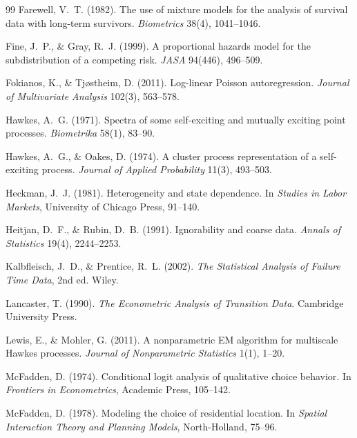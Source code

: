 \documentclass[11pt]{article}
\numberwithin{assumption}{section}
\numberwithin{proposition}{section}
\numberwithin{remark}{section}
\begin{document}
\begin{thebibliography}{99}
Farewell, V.~T. (1982). The use of mixture models for the analysis of
survival data with long-term survivors. \emph{Biometrics} 38(4),
1041--1046.

Fine, J.~P., \& Gray, R.~J. (1999). A proportional hazards model for the
subdistribution of a competing risk. \emph{JASA} 94(446), 496--509.

Fokianos, K., \& Tj{\o}stheim, D. (2011). Log-linear Poisson
autoregression. \emph{Journal of Multivariate Analysis} 102(3), 563--578.

Hawkes, A.~G. (1971). Spectra of some self-exciting and mutually exciting
point processes. \emph{Biometrika} 58(1), 83--90.

Hawkes, A.~G., \& Oakes, D. (1974). A cluster process representation of a
self-exciting process. \emph{Journal of Applied Probability} 11(3),
493--503.

Heckman, J.~J. (1981). Heterogeneity and state dependence. In
\emph{Studies in Labor Markets}, University of Chicago Press, 91--140.

Heitjan, D.~F., \& Rubin, D.~B. (1991). Ignorability and coarse data.
\emph{Annals of Statistics} 19(4), 2244--2253.

Kalbfleisch, J.~D., \& Prentice, R.~L. (2002). \emph{The Statistical
Analysis of Failure Time Data}, 2nd ed. Wiley.

Lancaster, T. (1990). \emph{The Econometric Analysis of Transition Data}.
Cambridge University Press.

Lewis, E., \& Mohler, G. (2011). A nonparametric EM algorithm for
multiscale Hawkes processes. \emph{Journal of Nonparametric Statistics}
1(1), 1--20.

McFadden, D. (1974). Conditional logit analysis of qualitative choice
behavior. In \emph{Frontiers in Econometrics}, Academic Press, 105--142.

McFadden, D. (1978). Modeling the choice of residential location. In
\emph{Spatial Interaction Theory and Planning Models}, North-Holland,
75--96.


\end{thebibliography}
\end{document}

